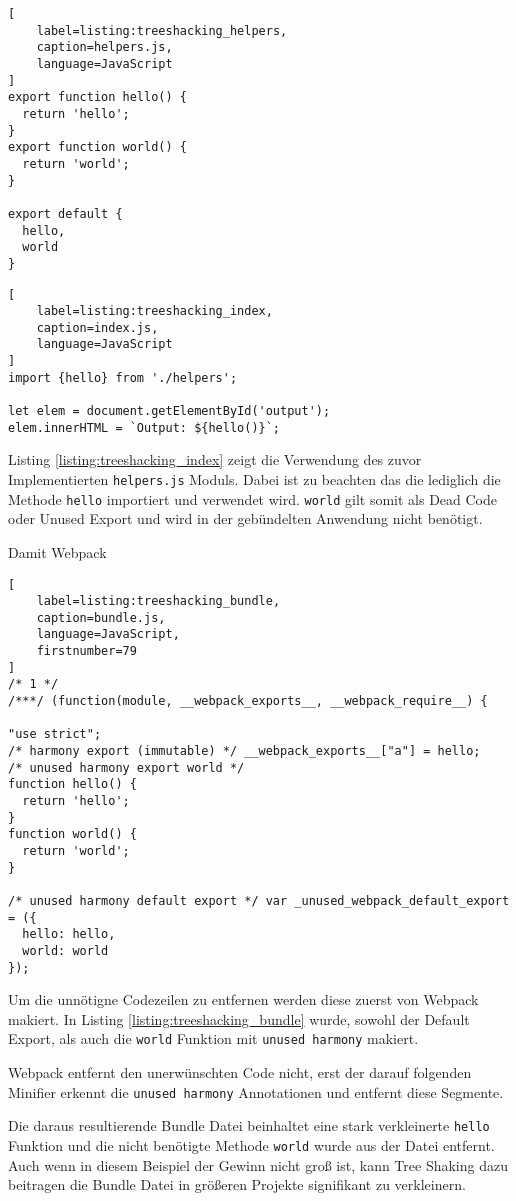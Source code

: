 \begin{lstlisting}[
    label=listing:treeshacking_helpers,
	caption=helpers.js,
	language=JavaScript
]
export function hello() {
  return 'hello';
}
export function world() {
  return 'world';
}

export default {
  hello,
  world
}
\end{lstlisting}

\begin{lstlisting}[
    label=listing:treeshacking_index,
	caption=index.js,
	language=JavaScript
]
import {hello} from './helpers';

let elem = document.getElementById('output');
elem.innerHTML = `Output: ${hello()}`;
\end{lstlisting}

Listing \ref{listing:treeshacking_index} zeigt die Verwendung des zuvor Implementierten \lstinline{helpers.js} Moduls. Dabei ist zu beachten das die lediglich die Methode \lstinline{hello} importiert und verwendet wird. \lstinline{world} gilt somit als Dead Code oder Unused Export und wird in der gebündelten Anwendung nicht benötigt.

Damit Webpack

\begin{lstlisting}[
    label=listing:treeshacking_bundle,
	caption=bundle.js,
	language=JavaScript,
    firstnumber=79
]
/* 1 */
/***/ (function(module, __webpack_exports__, __webpack_require__) {

"use strict";
/* harmony export (immutable) */ __webpack_exports__["a"] = hello;
/* unused harmony export world */
function hello() {
  return 'hello';
}
function world() {
  return 'world';
}

/* unused harmony default export */ var _unused_webpack_default_export = ({
  hello: hello,
  world: world
});
\end{lstlisting}

Um die unnötigne Codezeilen zu entfernen werden diese zuerst von Webpack makiert. In Listing \ref{listing:treeshacking_bundle} wurde, sowohl der Default Export, als auch die \lstinline{world} Funktion mit \lstinline{unused harmony} makiert.

Webpack entfernt den unerwünschten Code nicht, erst der darauf folgenden Minifier erkennt die \lstinline{unused harmony} Annotationen und entfernt diese Segmente.

Die daraus resultierende Bundle Datei beinhaltet eine stark verkleinerte \lstinline{hello} Funktion und die nicht benötigte Methode \lstinline{world} wurde aus der Datei entfernt. Auch wenn in diesem Beispiel der Gewinn nicht groß ist, kann Tree Shaking dazu beitragen die Bundle Datei in größeren Projekte signifikant zu verkleinern.
\autocite{WebpackTreeShaking}

